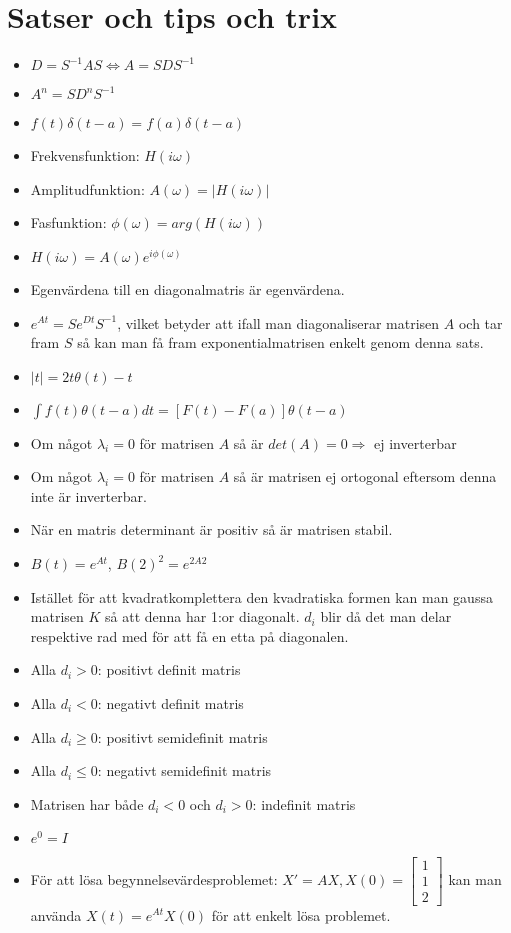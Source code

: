 \documentclass[a4paper]{article}
\begin{document}
\section{Satser och tips och trix}
\begin{itemize}
\item $D=S^{-1}AS \Leftrightarrow A=SDS^{-1}$
\item $A^n=SD^{n}S^{-1}$
\item $f(t)\delta(t-a)=f(a)\delta(t-a)$
\item Frekvensfunktion: $H(i\omega)$
\item Amplitudfunktion: $A(\omega)=|H(i\omega)|$
\item Fasfunktion:      $\phi(\omega)=arg(H(i\omega))$
\item $H(i\omega)=A(\omega)e^{i\phi(\omega)}$
\item Egenvärdena till en diagonalmatris är egenvärdena.
\item $e^{At}=Se^{Dt}S^{-1}$, vilket betyder att ifall man diagonaliserar matrisen $A$ och tar fram $S$ så kan man få fram exponentialmatrisen enkelt genom denna sats.
\item $|t|=2t\theta(t)-t$
\item ${\int}f(t)\theta(t-a)dt=[F(t)-F(a)]\theta(t-a)$
\item Om något $\lambda_i=0$ för matrisen $A$ så är $det(A)=0\Rightarrow$ ej inverterbar 
\item Om något $\lambda_i=0$ för matrisen $A$ så är matrisen ej ortogonal eftersom denna inte är inverterbar.
\item När en matris determinant är positiv så är matrisen stabil. 
\item $B(t)=e^{At}$, $B(2)^2=e^{2A2}$
\item Istället för att kvadratkomplettera den kvadratiska formen kan man gaussa matrisen $K$ så att denna har 1:or diagonalt. $d_i$ blir då det man delar respektive rad med för att få en etta på diagonalen.
\item Alla $d_i>0$: positivt definit matris
\item Alla $d_i<0$: negativt definit matris
\item Alla $d_i\geq0$: positivt semidefinit matris
\item Alla $d_i\leq0$: negativt semidefinit matris
\item Matrisen har både $d_i<0$ och $d_i>0$: indefinit matris
\item $e^0 = I$
\item För att lösa begynnelsevärdesproblemet: $X'=AX, X(0)=\begin{bmatrix} 1 \\ 1 \\ 2 \end{bmatrix}$ kan man använda $X(t)=e^{At}X(0)$ för att enkelt lösa problemet.

\end{itemize}
\end{document}
